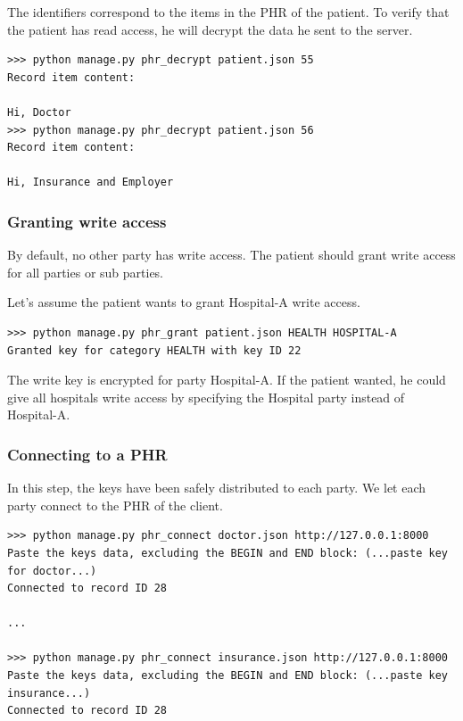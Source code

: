 \documentclass[a4paper]{article}
\begin{document}
			The identifiers correspond to the items in the PHR of the patient. To verify that the patient has read access, he will decrypt the data he sent to the server.
		
			\begin{lstlisting}
>>> python manage.py phr_decrypt patient.json 55
Record item content:

Hi, Doctor
>>> python manage.py phr_decrypt patient.json 56
Record item content:

Hi, Insurance and Employer
			\end{lstlisting}
		
		\subsubsection{Granting write access}\label{sec:usecase_3}
			By default, no other party has write access. The patient should grant write access for all parties or sub parties.
		
			Let's assume the patient wants to grant Hospital-A write access.
			
			\begin{lstlisting}		
>>> python manage.py phr_grant patient.json HEALTH HOSPITAL-A
Granted key for category HEALTH with key ID 22
			\end{lstlisting}
			
			The write key is encrypted for party Hospital-A. If the patient wanted, he could give all hospitals write access by specifying the Hospital party instead of Hospital-A.
		
		\subsubsection{Connecting to a PHR}\label{sec:usecase_4}
			In this step, the keys have been safely distributed to each party. We let each party connect to the PHR of the client.
		
			\begin{lstlisting}
>>> python manage.py phr_connect doctor.json http://127.0.0.1:8000
Paste the keys data, excluding the BEGIN and END block: (...paste key for doctor...)
Connected to record ID 28

...

>>> python manage.py phr_connect insurance.json http://127.0.0.1:8000
Paste the keys data, excluding the BEGIN and END block: (...paste key insurance...)
Connected to record ID 28
			\end{lstlisting}
			
\end{document}
